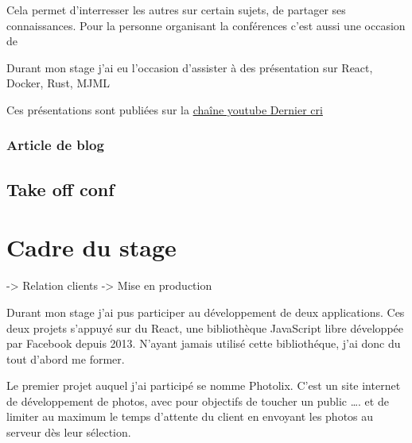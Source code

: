 \documentclass[12pt,a4paper]{article}
\begin{document}
  \bigskip

  Cela permet d'interresser les autres sur certain sujets, de partager ses
  connaissances. Pour la personne organisant la conférences c'est aussi
  une occasion de

  \bigskip

  Durant mon stage j'ai eu l'occasion d'assister à des présentation sur
  React, Docker, Rust, MJML

  \bigskip

  Ces présentations sont publiées sur la
  \href{https://www.youtube.com/channel/UCDfdBlzldhg_PEu3xZTPsHg}{chaîne
  youtube Dernier cri}

  \bigskip

  \subsubsection{Article de blog}\label{article-de-blog}

  \bigskip

  \bigskip

  \subsection{Take off conf}\label{take-off-conf}

  \bigskip

  \bigskip

  \newpage

  \section{Cadre du stage}\label{cadre-du-stage}

  \bigskip

  -\textgreater{} Relation clients -\textgreater{} Mise en production

  Durant mon stage j'ai pus participer au développement de deux
  applications. Ces deux projets s'appuyé sur du React, une bibliothèque
  JavaScript libre développée par Facebook depuis 2013. N'ayant jamais
  utilisé cette bibliothéque, j'ai donc du tout d'abord me former.

  \bigskip

  Le premier projet auquel j'ai participé se nomme Photolix. C'est un site
  internet de développement de photos, avec pour objectifs de toucher un
  public \ldots{}. et de limiter au maximum le temps d'attente du client
  en envoyant les photos au serveur dès leur sélection.
\end{document}
